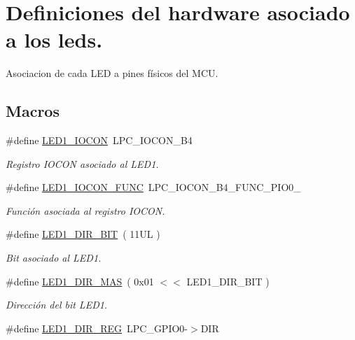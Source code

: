 \hypertarget{group___d_e_f_i_n_e_s_l_e_d}{}\section{Definiciones del hardware asociado a los leds.}
\label{group___d_e_f_i_n_e_s_l_e_d}


Asociacion de cada L\+ED a pines físicos del M\+CU.  


\subsection*{Macros}
\begin{DoxyCompactItemize}
\item 
\#define \hyperlink{group___d_e_f_i_n_e_s_l_e_d_gaa57bd810e922011351ef20f129cc5411}{L\+E\+D1\+\_\+\+I\+O\+C\+ON}~L\+P\+C\+\_\+\+I\+O\+C\+O\+N\+\_\+\+B4
\begin{DoxyCompactList}\small\item\em Registro I\+O\+C\+ON asociado al L\+E\+D1. \end{DoxyCompactList}\item 
\#define \hyperlink{group___d_e_f_i_n_e_s_l_e_d_ga1787581366e41db5124ae46f50f6dd3b}{L\+E\+D1\+\_\+\+I\+O\+C\+O\+N\+\_\+\+F\+U\+NC}~L\+P\+C\+\_\+\+I\+O\+C\+O\+N\+\_\+\+B4\+\_\+\+F\+U\+N\+C\+\_\+\+P\+I\+O0\+\_
\begin{DoxyCompactList}\small\item\em Función asociada al registro I\+O\+C\+ON. \end{DoxyCompactList}\item 
\#define \hyperlink{group___d_e_f_i_n_e_s_l_e_d_gae2a3615be3480b85cf17a93fdbfb7b7a}{L\+E\+D1\+\_\+\+D\+I\+R\+\_\+\+B\+IT}~( 11\+U\+L )
\begin{DoxyCompactList}\small\item\em Bit asociado al L\+E\+D1. \end{DoxyCompactList}\item 
\#define \hyperlink{group___d_e_f_i_n_e_s_l_e_d_gadac6e35960c534a36409c952d014cb37}{L\+E\+D1\+\_\+\+D\+I\+R\+\_\+\+M\+AS}~( 0x01 $<$$<$ L\+E\+D1\+\_\+\+D\+I\+R\+\_\+\+B\+I\+T )
\begin{DoxyCompactList}\small\item\em Dirección del bit L\+E\+D1. \end{DoxyCompactList}\item 
\#define \hyperlink{group___d_e_f_i_n_e_s_l_e_d_ga365ced0f8a8418c3c8fba173644c7c30}{L\+E\+D1\+\_\+\+D\+I\+R\+\_\+\+R\+EG}~L\+P\+C\+\_\+\+G\+P\+I\+O0-\/$>$D\+IR
$$
\end{DoxyCompactItemize}
